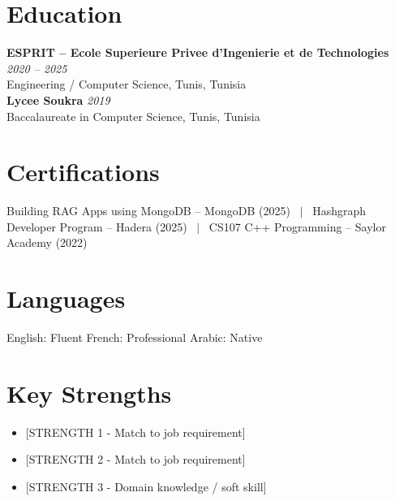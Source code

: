 \documentclass[10pt,a4paper]{article}
\begin{document}
\section*{Education}
\small
\textbf{ESPRIT -- Ecole Superieure Privee d'Ingenierie et de Technologies} \hfill \textit{2020 -- 2025}\\
Engineering / Computer Science, Tunis, Tunisia\\[2pt]
\textbf{Lycee Soukra} \hfill \textit{2019}\\
Baccalaureate in Computer Science, Tunis, Tunisia

\section*{Certifications}
\small
Building RAG Apps using MongoDB -- MongoDB (2025) \ $\vert$ \
Hashgraph Developer Program -- Hadera (2025) \ $\vert$ \
CS107 C++ Programming -- Saylor Academy (2022)

\section*{Languages}
\small
English: Fluent \quad French: Professional \quad Arabic: Native

\section*{Key Strengths}
\small
\begin{itemize}[leftmargin=14pt,itemsep=1pt,topsep=2pt,parsep=0pt]
  \item {[STRENGTH 1 - Match to job requirement]}
  \item {[STRENGTH 2 - Match to job requirement]}
  \item {[STRENGTH 3 - Domain knowledge / soft skill]}
\end{itemize}
\end{document}
